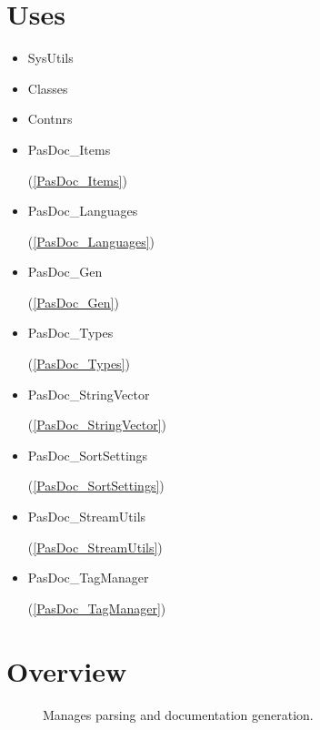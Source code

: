 \documentclass{report}
\begin{document}
\section{Uses}
\begin{itemize}
\item \begin{ttfamily}SysUtils\end{ttfamily}\item \begin{ttfamily}Classes\end{ttfamily}\item \begin{ttfamily}Contnrs\end{ttfamily}\item \begin{ttfamily}PasDoc{\_}Items\end{ttfamily}(\ref{PasDoc_Items})\item \begin{ttfamily}PasDoc{\_}Languages\end{ttfamily}(\ref{PasDoc_Languages})\item \begin{ttfamily}PasDoc{\_}Gen\end{ttfamily}(\ref{PasDoc_Gen})\item \begin{ttfamily}PasDoc{\_}Types\end{ttfamily}(\ref{PasDoc_Types})\item \begin{ttfamily}PasDoc{\_}StringVector\end{ttfamily}(\ref{PasDoc_StringVector})\item \begin{ttfamily}PasDoc{\_}SortSettings\end{ttfamily}(\ref{PasDoc_SortSettings})\item \begin{ttfamily}PasDoc{\_}StreamUtils\end{ttfamily}(\ref{PasDoc_StreamUtils})\item \begin{ttfamily}PasDoc{\_}TagManager\end{ttfamily}(\ref{PasDoc_TagManager})\end{itemize}
\section{Overview}
\begin{description}
\item[\texttt{\begin{ttfamily}TPasDoc\end{ttfamily} Class}]Manages parsing and documentation generation.
\end{description}
\end{document}
